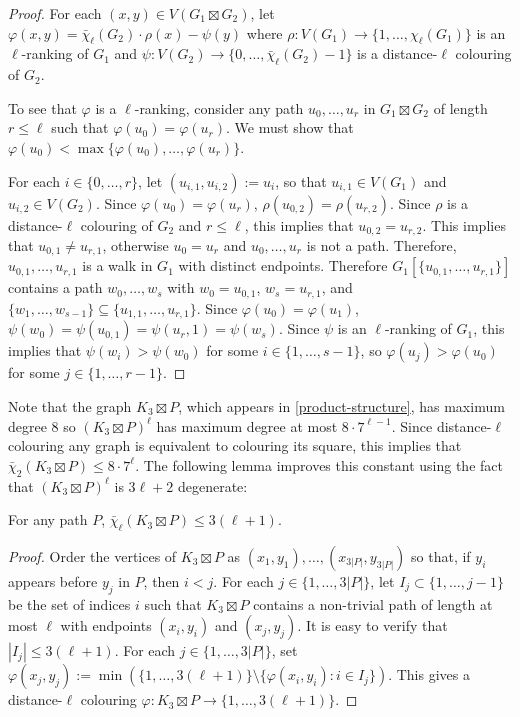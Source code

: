 \documentclass[kpfonts]{patmorin}
\newcommand{\lrn}{\chi_{\ell}}
\newcommand{\dtcn}{\bar{\chi}_2}
\newcommand{\dlcn}{\bar{\chi}_\ell}
\theoremstyle{named}
\begin{document}
\begin{proof}
    For each $(x,y)\in V(G_1\boxtimes G_2)$, let $\varphi(x,y)=\dlcn(G_2)\cdot \rho(x) - \psi(y)$ where $\rho:V(G_1)\to\{1,\ldots,\lrn(G_1)\}$ is an $\ell$-ranking of $G_1$ and $\psi:V(G_2)\to\{0,\ldots,\dlcn(G_2)-1\}$ is a distance-$\ell$ colouring of $G_2$.

    To see that $\varphi$ is a $\ell$-ranking, consider any
    path $u_0,\ldots,u_r$ in $G_1\boxtimes G_2$ of length $r\le\ell$ such that $\varphi(u_0)=\varphi(u_r)$.  We must show that $\varphi(u_0)<\max\{\varphi(u_0),\ldots,\varphi(u_r)\}$.

    For each $i\in\{0,\ldots,r\}$, let $(u_{i,1},u_{i,2}):=u_i$, so that $u_{i,1}\in V(G_1)$ and $u_{i,2}\in V(G_2)$. Since $\varphi(u_0)=\varphi(u_r)$, $\rho(u_{0,2})=\rho(u_{r,2})$. Since $\rho$ is a distance-$\ell$ colouring of $G_2$ and $r\le\ell$, this implies that $u_{0,2}=u_{r,2}$.  This implies that $u_{0,1}\neq u_{r,1}$, otherwise $u_0=u_r$ and $u_0,\ldots,u_r$ is not a path.  Therefore, $u_{0,1},\ldots,u_{r,1}$ is a walk in $G_1$ with distinct endpoints.  Therefore $G_1[\{u_{0,1},\ldots,u_{r,1}\}]$ contains a path $w_0,\ldots,w_s$ with $w_0=u_{0,1}$, $w_s=u_{r,1}$, and $\{w_1,\ldots,w_{s-1}\}\subseteq \{u_{1,1},\ldots,u_{r,1}\}$. Since $\varphi(u_0)=\varphi(u_1)$, $\psi(w_0)=\psi(u_{0,1})=\psi(u_r,1)=\psi(w_s)$.
    Since $\psi$ is an $\ell$-ranking of $G_1$, this implies that $\psi(w_i)>\psi(w_0)$ for some $i\in\{1,\ldots,s-1\}$, so $\varphi(u_{j})>\varphi(u_0)$ for some $j\in\{1,\ldots,r-1\}$.
\end{proof}

Note that the graph $K_3\boxtimes P$, which appears in \cref{product-structure}, has maximum degree 8 so $(K_3\boxtimes P)^\ell$ has maximum degree at most $8\cdot 7^{\ell-1}$.  Since distance-$\ell$ colouring any graph is equivalent to colouring its square, this implies that $\dtcn(K_3\boxtimes P)\le 8\cdot7^\ell$. The following lemma improves this constant using the fact that $(K_3\boxtimes P)^\ell$ is $3\ell+2$ degenerate:

\begin{lem}\label{dumb}
    For any path $P$, $\dlcn(K_3\boxtimes P)\le 3(\ell+1)$.
\end{lem}

\begin{proof}
    Order the vertices of $K_3\boxtimes P$ as $(x_1,y_1),\ldots,(x_{3|P|},y_{3|P|})$ so that, if $y_i$ appears before $y_j$ in $P$, then $i<j$. For each $j\in\{1,\ldots,3|P|\}$, let $I_j\subset\{1,\ldots,j-1\}$ be the set of indices $i$ such that $K_3\boxtimes P$ contains a non-trivial path of length at most $\ell$ with endpoints $(x_i,y_i)$ and $(x_j,y_j)$.  It is easy to verify that $|I_j|\le 3(\ell+1)$.  For each $j\in\{1,\ldots,3|P|\}$, set $\varphi(x_j,y_j):=\min(\{1,\ldots,3(\ell+1)\}\setminus\{\varphi(x_i,y_i):i\in I_j\})$.  This gives a distance-$\ell$ colouring $\varphi:K_3\boxtimes P\to\{1,\ldots,3(\ell+1)\}$.
\end{proof}
\end{document}
